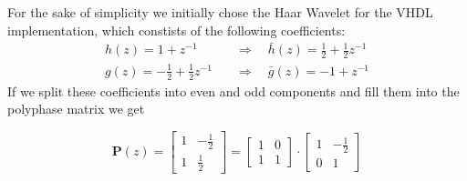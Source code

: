 \begin{refsection}
For the sake of simplicity we initially chose the Haar Wavelet for the VHDL implementation, which constists of the following coefficients:
\begin{align}
h(z) = 1 + z^{-1} \quad & \Rightarrow \quad \bar h(z) = \frac{1}{2} + \frac{1}{2} z^{-1}
\\
g(z) = - \frac{1}{2} + \frac{1}{2} z^{-1} \quad & \Rightarrow \quad \bar g(z) = -1 + z^{-1}
\end{align}
If we split these coefficients into even and odd components and fill them into the polyphase matrix we get 

\begin{equation*}
\bm P(z) =
\begin{bmatrix}
1 & -\frac{1}{2} \\
1 & \frac{1}{2}
\end{bmatrix}
 = 
 \begin{bmatrix}
 1 & 0 \\
 1 & 1
 \end{bmatrix}
 \cdot
 \begin{bmatrix}
 1 & -\frac{1}{2} \\
 0 & 1
 \end{bmatrix}
\end{equation*}


\end{refsection}

